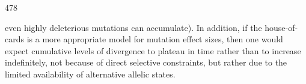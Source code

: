 \documentclass{article}
\begin{document}
478

even highly deleterious mutations can accumulate). In addition, if the house-of-cards is a more appropriate model for mutation effect sizes, then one would expect cumulative levels of divergence to plateau in time rather than to increase indefinitely, not because of direct selective constraints, but rather due to the limited availability of alternative allelic states.
\end{document}
